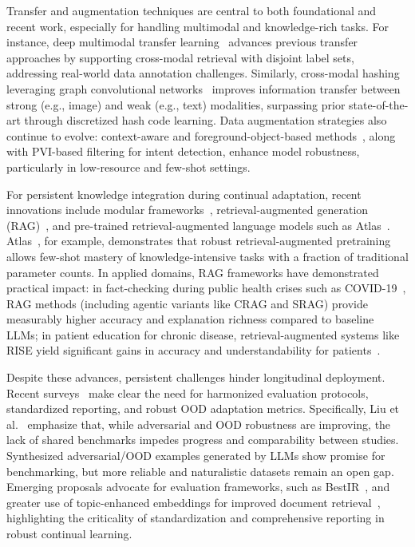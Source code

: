 \documentclass[sigconf]{acmart}
\begin{document}
Transfer and augmentation techniques are central to both foundational and recent work, especially for handling multimodal and knowledge-rich tasks. For instance, deep multimodal transfer learning~\cite{ref19} advances previous transfer approaches by supporting cross-modal retrieval with disjoint label sets, addressing real-world data annotation challenges. Similarly, cross-modal hashing leveraging graph convolutional networks~\cite{ref20} improves information transfer between strong (e.g., image) and weak (e.g., text) modalities, surpassing prior state-of-the-art through discretized hash code learning. Data augmentation strategies also continue to evolve: context-aware and foreground-object-based methods~\cite{ref61,ref62}, along with PVI-based filtering for intent detection, enhance model robustness, particularly in low-resource and few-shot settings.

For persistent knowledge integration during continual adaptation, recent innovations include modular frameworks~\cite{ref7,ref29}, retrieval-augmented generation (RAG)~\cite{ref54,ref55,ref64}, and pre-trained retrieval-augmented language models such as Atlas~\cite{ref22}. Atlas~\cite{ref22}, for example, demonstrates that robust retrieval-augmented pretraining allows few-shot mastery of knowledge-intensive tasks with a fraction of traditional parameter counts. In applied domains, RAG frameworks have demonstrated practical impact: in fact-checking during public health crises such as COVID-19~\cite{ref54}, RAG methods (including agentic variants like CRAG and SRAG) provide measurably higher accuracy and explanation richness compared to baseline LLMs; in patient education for chronic disease, retrieval-augmented systems like RISE yield significant gains in accuracy and understandability for patients~\cite{ref55}.

Despite these advances, persistent challenges hinder longitudinal deployment. Recent surveys~\cite{ref26,ref64} make clear the need for harmonized evaluation protocols, standardized reporting, and robust OOD adaptation metrics. Specifically, Liu et al.~\cite{ref26} emphasize that, while adversarial and OOD robustness are improving, the lack of shared benchmarks impedes progress and comparability between studies. Synthesized adversarial/OOD examples generated by LLMs show promise for benchmarking, but more reliable and naturalistic datasets remain an open gap. Emerging proposals advocate for evaluation frameworks, such as BestIR~\cite{ref26}, and greater use of topic-enhanced embeddings for improved document retrieval~\cite{ref46}, highlighting the criticality of standardization and comprehensive reporting in robust continual learning.
\end{document}
